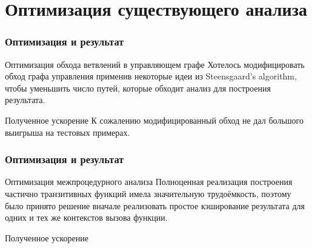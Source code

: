 \documentclass[utf8,russian]{beamer}
\begin{document}
\section{Оптимизация существующего анализа}

\begin{frame}
\frametitle{Оптимизация и результат}

\begin{block}{Оптимизация обхода ветвлений в управляющем графе}
Хотелось модифицировать обход графа управления применив некоторые идеи из Steensgaard’s algorithm, чтобы уменьшить число путей, которые обходит анализ для построения результата.
\end{block}

\begin{block}{Полученное ускорение}
К сожалению модифицированный обход не дал большого выигрыша на тестовых примерах.  
\end{block}

\end{frame}


\begin{frame}
\frametitle{Оптимизация и результат}

\begin{block}{Оптимизация межпроцедурного анализа}
Полноценная реализация построения частично транзитивных функций имела значительную трудоёмкость, поэтому было принято решение вначале реализовать простое кэширование результата для одних и тех же контекстов вызова функции.
\end{block}

\begin{block}{Полученное ускорение}

\end{block}

\end{frame}

\end{document}
